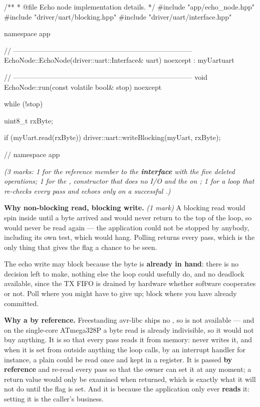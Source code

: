 \begin{cppcode}
/**
 * @file Echo node implementation details.
 */
#include "app/echo_node.hpp"
#include "driver/uart/blocking.hpp"
#include "driver/uart/interface.hpp"

namespace app
{
// -----------------------------------------------------------------------------
EchoNode::EchoNode(driver::uart::Interface& uart) noexcept
    : myUart{uart}
{}

// -----------------------------------------------------------------------------
void EchoNode::run(const volatile bool& stop) noexcept
{
    while (!stop)
    {
        uint8_t rxByte{};

        if (myUart.read(rxByte)) { driver::uart::writeBlocking(myUart, rxByte); }
    }
}
} // namespace app
\end{cppcode}

{\itshape (3 marks: 1 for the reference member to the \textbf{interface} with the five deleted
operations; 1 for the ,  constructor that does no I/O and the
 on ; 1 for a loop that re-checks  every pass and echoes only on
a successful .)\par}

\medskip
\textbf{Why non-blocking read, blocking write.} \textit{(1 mark)} A blocking read would spin inside
 until a byte arrived and would never return to the top of the loop, so
 would never be read again --- the application could not be stopped by anybody, including
its own test, which would hang. Polling  returns every pass, which is the only thing
that gives the flag a chance to be seen.

The echo write may block because the byte is \textbf{already in hand}: there is no decision left to
make, nothing else the loop could usefully do, and no deadlock available, since the TX FIFO is
drained by hardware whether software cooperates or not. Poll where you might have to give up; block
where you have already committed.

\textbf{Why a  by  reference.} Freestanding avr-libc ships no
, so  is not available --- and on the single-core ATmega328P a
byte read is already indivisible, so it would not buy anything. It is  so that every
pass reads it from memory:  never writes it, and when it is set from outside anything the
loop calls, by an interrupt handler for instance, a plain  could be read once and kept in
a register. It is passed \textbf{by reference}
and re-read every pass so that the owner can set it at any moment; a return value would only be
examined when  returned, which is exactly what it will not do until the flag is set. And
it is  because the application only ever \textbf{reads} it: setting it is the caller's
business.

